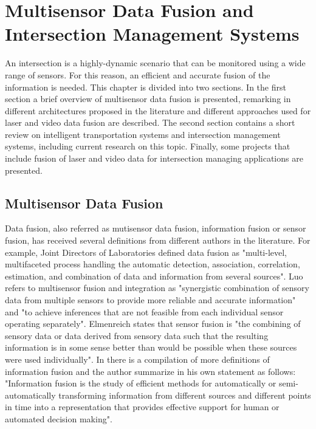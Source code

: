 %

\chapter [Sensor Fusion and IMS]{Multisensor Data Fusion and Intersection Management Systems}

An intersection is a highly-dynamic scenario that can be monitored using a wide range of sensors. For this reason, an efficient and accurate fusion of the information is needed. This chapter is divided into two sections. In the first section a brief overview of multisensor data fusion is presented, remarking in different architectures proposed in the literature and different approaches used for laser and video data fusion are described.
The second section contains a short review on intelligent transportation systems and intersection management systems, including current research on this topic. Finally, some projects that include fusion of laser and video data for intersection managing applications are presented.

\section{Multisensor Data Fusion}

Data fusion, also referred as mutisensor data fusion, information fusion or sensor fusion, has received several definitions from different authors in the literature. For example, Joint Directors of Laboratories defined data fusion as "multi-level, multifaceted process handling the automatic detection, association, correlation, estimation, and combination of data and information from several sources"\cite{White1991}. Luo refers to multisensor fusion and integration as "synergistic combination of sensory data from multiple sensors to provide more reliable and accurate information"\cite{Luo2002} and "to achieve inferences that are not feasible from each individual sensor operating separately"\cite{Luo2011}. Elmenreich states that sensor fusion is "the combining of sensory data or data derived from sensory data such that the resulting information is in some sense better than would be possible when these sources were used individually"\cite{Elmenreich2007}. In \cite{Bostrom2007} there is a compilation of more definitions of information fusion and the author summarize in his own statement as follows: "Information fusion is the study of efficient methods for automatically or semi-automatically transforming information from different sources and different points in time into a representation that provides effective support for human or automated decision making".  

